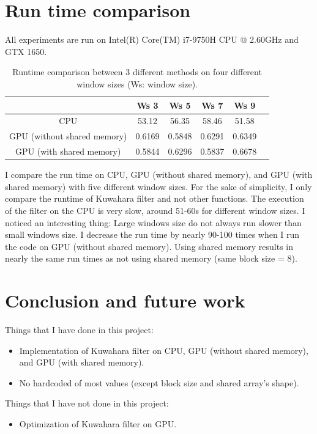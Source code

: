 \documentclass[12pt]{article}
\begin{document}
\section{Run time comparison}

\noindent
All experiments are run on Intel(R) Core(TM) i7-9750H CPU @ 2.60GHz and GTX 1650.

\begin{table}[h]
    \centering
    \begin{tabular}{|c|c|c|c|c|c|}
        \hline
         & Ws 3 & Ws 5 & Ws 7 & Ws 9 \\ 
        \hline
        CPU & 53.12 & 56.35 & 58.46 & 51.58\\ 
        \hline
        GPU (without shared memory) & 0.6169 & 0.5848 & 0.6291 & 0.6349\\ 
        \hline
        GPU (with shared memory) & 0.5844 & 0.6296 & 0.5837& 0.6678 \\ 
        \hline
    \end{tabular}
    \caption{Runtime comparison between 3 different methods on four different window sizes (Ws: window size).}
    \label{tab:mytable}
\end{table}

\noindent
I compare the run time on CPU, GPU (without shared memory), and GPU (with shared memory) with five different window sizes. For the sake of simplicity, I only compare the runtime of Kuwahara filter and not other functions. The execution of the filter on the CPU is very slow, around 51-60s for different window sizes. I noticed an interesting thing: Large windows size do not always run slower than small windows size. I decrease the run time by nearly 90-100 times when I run the code on GPU (without shared memory). Using shared memory results in nearly the same run times as not using shared memory (same block size = 8). 

\section{Conclusion and future work}

\noindent
Things that I have done in this project:
\begin{itemize}
    \item Implementation of Kuwahara filter on CPU, GPU (without shared memory), and GPU (with shared memory).
    \item No hardcoded of most values (except block size and shared array's shape).
\end{itemize}

\noindent
Things that I have not done in this project:
\begin{itemize}
    \item Optimization of Kuwahara filter on GPU.
\end{itemize}
\end{document}
